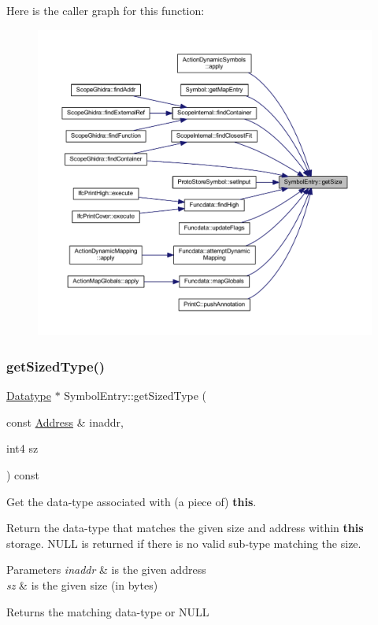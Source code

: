 Here is the caller graph for this function\+:
\nopagebreak
\begin{figure}[H]
\begin{center}
\leavevmode
\includegraphics[width=350pt]{class_symbol_entry_aced6757088dfc0497320dd6750aedf04_icgraph}
\end{center}
\end{figure}
\mbox{\label{class_symbol_entry_a84cb58373a0e587c0698396a65f3a9b9}} 
\subsubsection{\texorpdfstring{getSizedType()}{getSizedType()}}
{\footnotesize\ttfamily \mbox{\hyperlink{class_datatype}{Datatype}} $\ast$ Symbol\+Entry\+::get\+Sized\+Type (\begin{DoxyParamCaption}\item[{const \mbox{\hyperlink{class_address}{Address}} \&}]{inaddr,  }\item[{int4}]{sz }\end{DoxyParamCaption}) const}



Get the data-\/type associated with (a piece of) {\bfseries{this}}. 

Return the data-\/type that matches the given size and address within {\bfseries{this}} storage. N\+U\+LL is returned if there is no valid sub-\/type matching the size. 
\begin{DoxyParams}{Parameters}
{\em inaddr} & is the given address \\
\hline
{\em sz} & is the given size (in bytes) \\
\hline
\end{DoxyParams}
\begin{DoxyReturn}{Returns}
the matching data-\/type or N\+U\+LL 
\end{DoxyReturn}


